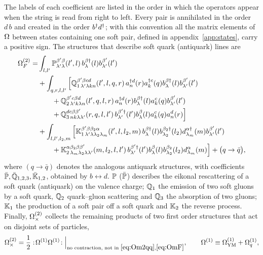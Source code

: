 The labels of each coefficient are listed in the order in which the operators appear when the
string is read from right to left. Every pair is annihilated in the order $d\,b$ and created in
the order $b^{\dagger}d^{\dagger}$; with this convention all the matrix elements of $\Omega$ between states
containing one soft pair, defined in appendix~\ref{app:states}, carry a positive sign. The
structures that describe soft quark (antiquark) lines are
{\small
\begin{align}
\Omega^{(2)}_{F}=&\int_{l,l'}\mathbb{P}^{\beta'\beta}_{\lambda'\lambda}(l',l)\,
b^{\beta\dagger}_{\lambda}(l)b^{\beta'}_{\lambda'}(l')
\nonumber\\
&+\int_{q,r,l,l'}\Big[\mathbb{Q}^{\beta'\beta cd}_{1\,\lambda'\lambda kn}(l',l,q,r)\,
a^{\dagger d}_{n}(r)a^{\dagger c}_{k}(q)b^{\beta\dagger}_{\lambda}(l)b^{\beta'}_{\lambda'}(l')
\nonumber\\
&\qquad+\mathbb{Q}^{\beta'c\beta d}_{2\,\lambda'k\lambda n}(l',q,l,r)\,
a^{\dagger d}_{n}(r)b^{\beta\dagger}_{\lambda}(l)a^{c}_{k}(q)b^{\beta'}_{\lambda'}(l')
\nonumber\\
&\qquad+\mathbb{Q}^{dc\beta\beta'}_{3\,nk\lambda\lambda'}(r,q,l,l')\,
b^{\beta'\dagger}_{\lambda'}(l')b^{\beta}_{\lambda}(l)a^{c}_{k}(q)a^{d}_{n}(r)\Big]
\nonumber\\
&+\int_{l,l',l_{2},m}\Big[\mathbb{K}^{\beta'\beta\beta_{2}\alpha}_{1\,\lambda'\lambda\lambda_{2}\lambda_{m}}(l',l,l_{2},m)\,
b^{\beta\dagger}_{\lambda}(l)b^{\beta_{2}\dagger}_{\lambda_{2}}(l_{2})d^{\alpha\dagger}_{\lambda_{m}}(m)b^{\beta'}_{\lambda'}(l')
\nonumber\\
&\qquad+\mathbb{K}^{\alpha\beta_{2}\beta\beta'}_{2\,\lambda_{m}\lambda_{2}\lambda\lambda'}(m,l_{2},l,l')\,
b^{\beta'\dagger}_{\lambda'}(l')b^{\beta}_{\lambda}(l)b^{\beta_{2}}_{\lambda_{2}}(l_{2})d^{\alpha}_{\lambda_{m}}(m)\Big]
+\big(q\to\bar q\big),
\label{eq:OmF}
\end{align}}
where $(q\to\bar q)$ denotes the analogous antiquark structures, with coefficients
$\bar{\mathbb{P}},\bar{\mathbb{Q}}_{1,2,3},\bar{\mathbb{K}}_{1,2}$, obtained by $b\leftrightarrow d$. $\mathbb{P}$
($\bar{\mathbb{P}}$) describes the eikonal rescattering of a soft quark (antiquark) on the valence
charge; $\mathbb{Q}_{1}$ the emission of two soft gluons by a soft quark, $\mathbb{Q}_{2}$ quark--gluon
scattering and $\mathbb{Q}_{3}$ the absorption of two gluons; $\mathbb{K}_{1}$ the production of a soft pair
off a soft quark and $\mathbb{K}_{2}$ the reverse process. Finally, $\Omega^{(2)}_{\times}$ collects the
remaining products of two first order structures that act on disjoint sets of particles,
\begin{equation}
\Omega^{(2)}_{\times}=\frac12:\!\Omega^{(1)}\Omega^{(1)}\!:\Big|_{\text{no contraction, not in }\eqref{eq:Om2qq},\eqref{eq:OmF}},
\qquad \Omega^{(1)}\equiv\Omega^{(1)}_{\rm YM}+\Omega^{(1)}_{q},
\label{eq:Omx}
\end{equation}
